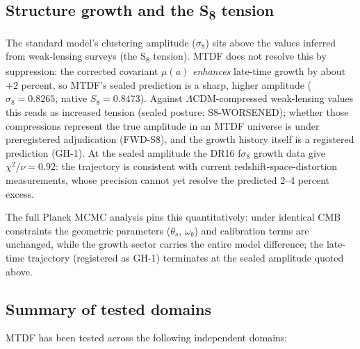 \documentclass[11pt,a4paper]{article}
\begin{document}
\subsection{Structure growth and the S\textsubscript{8} tension}
The standard model's clustering amplitude ($\sigma_8$) sits above the values inferred from weak-lensing surveys (the S\textsubscript{8} tension). MTDF does not resolve this by suppression: the corrected covariant $\mu(a)$ \emph{enhances} late-time growth by about $+2$ percent, so MTDF's sealed prediction is a sharp, higher amplitude ($\sigma_8 = 0.8265$, native $S_8 = 0.8473$). Against $\Lambda$CDM-compressed weak-lensing values this reads as increased tension (sealed posture: S8-WORSENED); whether those compressions represent the true amplitude in an MTDF universe is under preregistered adjudication (FWD-S8), and the growth history itself is a registered prediction (GH-1). At the sealed amplitude the DR16 f$\sigma_8$ growth data give $\chi^2/\nu = 0.92$: the trajectory is consistent with current redshift-space-distortion measurements, whose precision cannot yet resolve the predicted 2--4 percent excess.

The full Planck MCMC analysis pins this quantitatively: under identical CMB constraints the geometric parameters ($\theta_s$, $\omega_b$) and calibration terms are unchanged, while the growth sector carries the entire model difference; the late-time trajectory (registered as GH-1) terminates at the sealed amplitude quoted above.

\subsection{Summary of tested domains}
MTDF has been tested across the following independent domains:
\end{document}

